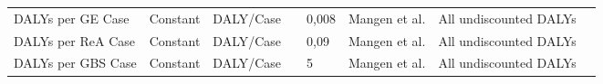 \begin{landscape}
\begin{longtable}[c]{m{10em}lllm{15em}lll}
DALYs per GE Case                             & Constant & DALY/Case                &                           & 0,008                                                                                                                                                                                                                                                                                    & Mangen et al.                                                                                                                                                                                & All undiscounted DALYs                                                                                                                                                                                                                \\
DALYs per ReA Case                            & Constant & DALY/Case                &                           & 0,09                                                                                                                                                                                                                                                                                     & Mangen et al.                                                                                                                                                                                & All undiscounted DALYs                                                                                                                                                                                                                \\
DALYs per GBS Case                            & Constant & DALY/Case                &                           & 5                                                                                                                                                                                                                                                                                        & Mangen et al.                                                                                                                                                                                & All undiscounted DALYs                                                                                                                                                                                                                \\

\end{longtable}
\end{landscape}
